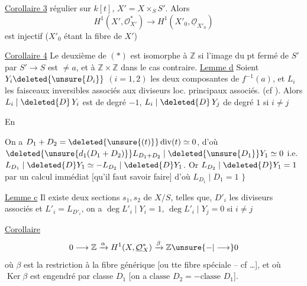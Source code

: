 \uline{Corollaire 3}   régulier sur $k[t]$, $X'=X\times_S S'$. Alors
\[
H^1(X',\mathcal O^*_{X'})\longrightarrow H^1(X'_0,\underline{\mathcal O}_{X'_0}) \tag*{$(*)$}
\]
est injectif ($X'_0$ étant la fibre  de $X'$)  

\uline{Corollaire 4} Le deuxième  de $(*)$ est  isomorphe à $\mathbb Z$ si  l'image du pt fermé de $S'$ par $S'\to S$ est  $\ne a$, et à $\mathbb Z\times\mathbb Z$ dans le cas contraire.
\uline{Lemme d} Soient $Y_i\deleted{\unsure{D_i}}$ $(i=1,2)$ les deux composantes de $f^{-1}(a)$, et $L_i$ les faisceaux inversibles associés  aux diviseurs loc. principaux associés. (cf ). Alors $L_i\mid\deleted{D}\,Y_{i}$ est de degré $-1$, $L_i\mid\deleted{D}\,Y_j$ de degré $1$ si $i\ne j$

En

On a $D_1+D_2=\deleted{\unsure{(t)}}\operatorname{div}(t)\simeq0$, d'où $\deleted{\unsure{d_1(D_1+D_2)}}L_{D_1+D_2}\mid\deleted{\unsure{D_1}}Y_1\simeq0$ i.e. $L_{D_1}\mid\deleted{D}Y_1\simeq-L_{D_{2}}\mid\deleted{D}Y_1$. Or $L_{D_2}\mid\deleted{D}Y_1=1$ par un calcul immédiat [qu'il faut savoir faire] d'où $L_{D_1}\mid D_1=1$ $\}$

\uline{Lemme c} Il existe deux sections $s_1,s_2$ de $X/S$, telles que,  $D'_i$  les diviseurs associés et $L'_i=L_{D'_i}$,  on a $\deg L'_i\mid Y_i=1$, $\deg L'_i\mid Y_j=0$ si $i\ne j$

\uline{Corollaire }  
\[
0\longrightarrow\mathbb Z\xrightarrow{\alpha}H^1(X,\underline{\mathcal O}_X^*)\xrightarrow{\beta}\mathbb Z\unsure{-|\longrightarrow}0
\]
où  $\beta$ est    la restriction à la fibre générique [ou tte fibre spéciale  -- cf \ldots], et où $\operatorname{Ker}\beta$ est engendré par  classe $D_1$ [on a $\text{classe }D_2=-\text{classe }D_1$].

